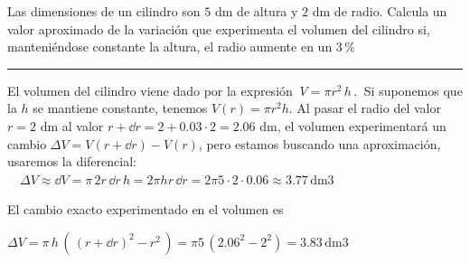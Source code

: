 \vspace{1cm}
\begin{miejercicio}

Las dimensiones de un cilindro son $5$ dm de altura y $2$ dm de radio. Calcula un valor aproximado de la variación que experimenta el volumen del cilindro si, manteniéndose constante la altura, el radio aumente en un $3\, \%$


\color{teal!80}
\rule{200pt}{0.2pt}
\color{black}
\vspace{5mm}

El volumen del cilindro viene dado por la expresión $\ V = \pi r^2\, h\, .\ $ Si suponemos que la $h$ se mantiene constante, tenemos $V (r) = \pi r^2 h$. Al pasar el radio del valor $r = 2$ dm al valor $r+\dd r = 2+0.03 \cdot 2 = 2.06$ dm, el volumen experimentará un cambio $\Delta V = V (r + \dd r) - V (r)$, pero estamos buscando una aproximación, usaremos  la diferencial:
$\quad \Delta V  \approx \dd V =\pi\, 2r\, \dd r\, h=2\pi hr\, \dd r=2\pi 5\cdot 2\cdot 0.06 \approx 3.77\, \mathrm{dm}3$

\vspace{3mm} \textcolor{gris}{El cambio exacto experimentado en el volumen es} 

\vspace{2mm} \textcolor{gris}{$\Delta V=\pi\, h\, (\, (r+\dd r)^2-r^2\, ) =\pi 5 \, (2.06^2-2^2)=3.83\, \mathrm{dm}3$}
\end{miejercicio}


